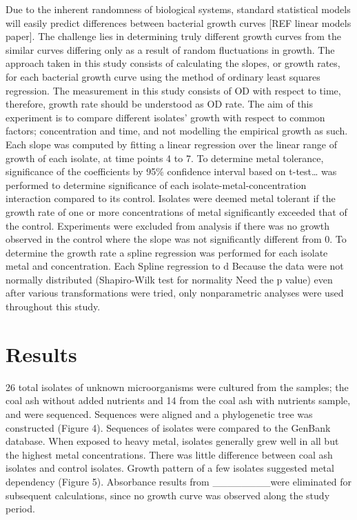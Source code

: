 \documentclass[ms]{uncgdissertationexp}
\theoremstyle{plain}
\theoremstyle{definition}
\theoremstyle{remark}
\begin{document}
  Due to the inherent randomness of biological systems, standard
  statistical models will easily predict differences between bacterial
  growth curves {[}REF linear models paper{]}. The challenge lies in
  determining truly different growth curves from the similar curves
  differing only as a result of random fluctuations in growth. The
  approach taken in this study consists of calculating the slopes, or
  growth rates, for each bacterial growth curve using the method of
  ordinary least squares regression. The measurement in this study
  consists of OD with respect to time, therefore, growth rate should be
  understood as OD rate. The aim of this experiment is to compare
  different isolates' growth with respect to common factors; concentration
  and time, and not modelling the empirical growth as such. Each slope was
  computed by fitting a linear regression over the linear range of growth
  of each isolate, at time points 4 to 7. To determine metal tolerance,
  significance of the coefficients by 95\% confidence interval based on
  t-test\ldots{} was performed to determine significance of each
  isolate-metal-concentration interaction compared to its control.
  Isolates were deemed metal tolerant if the growth rate of one or more
  concentrations of metal significantly exceeded that of the control.
  Experiments were excluded from analysis if there was no growth observed
  in the control where the slope was not significantly different from 0.
  To determine the growth rate a spline regression was performed for each
  isolate metal and concentration. Each Spline regression to d Because the
  data were not normally distributed (Shapiro-Wilk test for normality Need
  the p value) even after various transformations were tried, only
  nonparametric analyses were used throughout this study.
  
  \section{Results}\label{results-1}
  
  26 total isolates of unknown microorganisms were cultured from the
  samples; the coal ash without added nutrients and 14 from the coal ash
  with nutrients sample, and were sequenced. Sequences were aligned and a
  phylogenetic tree was constructed (Figure 4). Sequences of isolates were
  compared to the GenBank database. When exposed to heavy metal, isolates
  generally grew well in all but the highest metal concentrations. There
  was little difference between coal ash isolates and control isolates.
  Growth pattern of a few isolates suggested metal dependency (Figure 5).
  Absorbance results from \_\_\_\_\_\_\_\_were eliminated for subsequent
  calculations, since no growth curve was observed along the study period.
  
\end{document}
